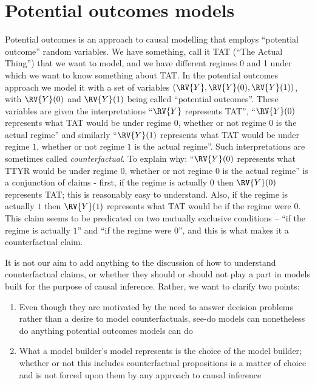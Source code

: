 

\section{Potential outcomes models}

Potential outcomes is an approach to causal modelling that employs ``potential outcome'' random variables. We have something, call it TAT (``The Actual Thing'') that we want to model, and we have different regimes 0 and 1 under which we want to know something about TAT. In the potential outcomes approach we model it with a set of variables $(\RV{Y}, \RV{Y}(0), \RV{Y}(1))$, with $\RV{Y}(0)$ and $\RV{Y}(1)$ being called ``potential outcomes''. These variables are given the interpretations ``$\RV{Y}$ represents TAT'', ``$\RV{Y}(0)$ represents what TAT would be under regime $0$, whether or not regime $0$ is the actual regime'' and similarly ``$\RV{Y}(1)$ represents what TAT would be under regime $1$, whether or not regime $1$ is the actual regime''. Such interpretations are sometimes called \emph{counterfactual}. To explain why: ``$\RV{Y}(0)$ represents what TTYR would be under regime $0$, whether or not regime $0$ is the actual regime'' is a conjunction of claims - first, if the regime is actually $0$ then $\RV{Y}(0)$ represents TAT; this is reasonably easy to understand. Also, if the regime is actually $1$ then $\RV{Y}(1)$ represents what TAT would be if the regime were $0$. This claim seems to be predicated on two mutually exclusive conditions -- ``if the regime is actually $1$'' and ``if the regime were $0$'', and this is what makes it a counterfactual claim.

It is not our aim to add anything to the discussion of how to understand counterfactual claims, or whether they should or should not play a part in models built for the purpose of causal inference. Rather, we want to clarify two points:

\begin{enumerate}
    \item Even though they are motivated by the need to answer decision problems rather than a desire to model counterfactuals, see-do models can nonetheless do anything potential outcomes models can do
    \item What a model builder's model represents is the choice of the model builder; whether or not this includes counterfactual propositions is a matter of choice and is not forced upon them by any approach to causal inference
\end{enumerate}

